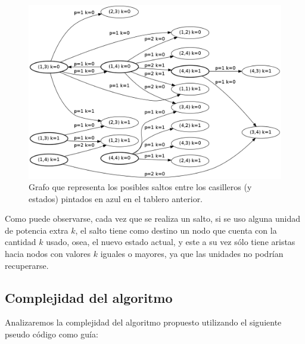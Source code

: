 \begin{figure}[h]
\begin{center}
\includegraphics[scale=0.3]{./img/ej3_grafo.png}
\caption{Grafo que representa los posibles saltos entre los casilleros (y estados) pintados en azul en el tablero anterior.}
\end{center}
\end{figure}

Como puede observarse, cada vez que se realiza un salto, si se uso alguna unidad de potencia extra $k$, el salto tiene como destino un nodo que cuenta con la cantidad $k$ usado, osea, el nuevo estado actual, y este a su vez s\'olo tiene aristas hacia nodos con valores $k$ iguales o mayores, ya que las unidades no podr\'ian recuperarse.
\newpage
\subsection{Complejidad del algoritmo}

Analizaremos la complejidad del algoritmo propuesto utilizando el siguiente pseudo c\'odigo como gu\'ia:

